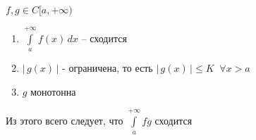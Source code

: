 
\newcommand*{\abs}[1]{\left|\,{#1}\,\right|} %

\begin{theorem}\slashns
	
	$f,g \in C[a,+\infty)$
	
	\begin{enumerate}
		\item $\int\limits_a^{+\infty} f(x) \, dx$ -- сходится
        \item $\abs{g(x)}$ - ограничена, то есть $\abs{g(x)} \le K \;\; \forall x > a$ 
		\item $g$ монотонна
	\end{enumerate}
	
	Из этого всего следует, что $\int\limits_a^{+\infty} fg$ сходится
\end{theorem}

